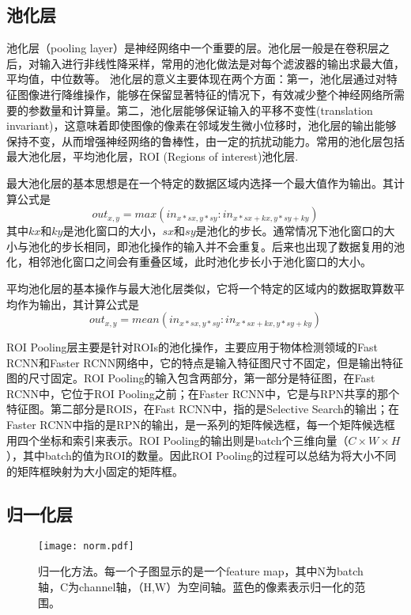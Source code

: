 \subsection{池化层}
池化层（pooling layer）是神经网络中一个重要的层。池化层一般是在卷积层之后，对输入进行非线性降采样，常用的池化做法是对每个滤波器的输出求最大值，平均值，中位数等。
池化层的意义主要体现在两个方面：第一，池化层通过对特征图像进行降维操作，能够在保留显著特征的情况下，有效减少整个神经网络所需要的参数量和计算量。第二，池化层能够保证输入的平移不变性(translation invariant)，这意味着即使图像的像素在邻域发生微小位移时，池化层的输出能够保持不变，从而增强神经网络的鲁棒性，由一定的抗扰动能力。常用的池化层包括最大池化层，平均池化层，ROI (Regions of interest)池化层.

最大池化层的基本思想是在一个特定的数据区域内选择一个最大值作为输出。其计算公式是
\begin{equation}
out_{x,y} = max(in_{x*sx,y*sy}:in_{x*sx+kx,y*sy+ky})
\end{equation}
其中$kx$和$ky$是池化窗口的大小，$sx$和$sy$是池化的步长。通常情况下池化窗口的大小与池化的步长相同，即池化操作的输入并不会重复。后来也出现了数据复用的池化，相邻池化窗口之间会有重叠区域，此时池化步长小于池化窗口的大小。


平均池化层的基本操作与最大池化层类似，它将一个特定的区域内的数据取算数平均作为输出，其计算公式是
\begin{equation}
out_{x,y}=mean(in_{x*sx,y*sy}:in_{x*sx+kx,y*sy+ky})
\end{equation}

ROI Pooling层主要是针对ROIs的池化操作，主要应用于物体检测领域的Fast RCNN和Faster RCNN网络中，它的特点是输入特征图尺寸不固定，但是输出特征图的尺寸固定。ROI Pooling的输入包含两部分，第一部分是特征图，在Fast RCNN中，它位于ROI Pooling之前；在Faster RCNN中，它是与RPN共享的那个特征图。第二部分是ROIS，在Fast RCNN中，指的是Selective Search的输出；在Faster RCNN中指的是RPN的输出，是一系列的矩阵候选框，每一个矩阵候选框用四个坐标和索引来表示。ROI Pooling的输出则是batch个三维向量（$C \times W\times H$），其中batch的值为ROI的数量。因此ROI Pooling的过程可以总结为将大小不同的矩阵框映射为大小固定的矩阵框。
 

\subsection{归一化层}

\begin{figure}[b]
  \centering
  \texttt{[image: norm.pdf]}
  \caption{\footnotesize 归一化方法。每一个子图显示的是一个feature map，其中N为batch轴，C为channel轴，（H,W）为空间轴。蓝色的像素表示归一化的范围。}
  \label{fig:norm}
\end{figure}

